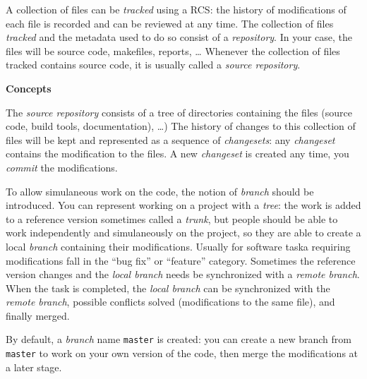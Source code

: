 \documentclass[onecolumn, oneside, a4paper, 11pt]{memoir}
\theoremstyle{remark}
\begin{document}
\medskip
A collection of files can be \textit{tracked} using a RCS: the history of modifications of each file is recorded and can be reviewed at any time.
The collection of files \textit{tracked} and the metadata used to do so consist of a \textit{repository}.
In your case, the files will be source code, makefiles, reports, \dots
Whenever the collection of files tracked contains source code, it is usually called a \textit{source repository}.

\bigskip
\textbf{Concepts}

\medskip
The \textit{source repository} consists of a tree of directories containing the files (source code, build tools, documentation), \dots)
The history of changes to this collection of files will be kept and represented as a sequence of \textit{changesets}: any \textit{changeset} contains the modification to the files.
A new \textit{changeset} is created any time, you \textit{commit} the modifications.

\medskip
To allow simulaneous work on the code, the notion of \textit{branch} should be introduced.
You can represent working on a project with a \textit{tree}: the work is added to a reference version sometimes called a \textit{trunk}, but people should be able to work independently and simulaneously on the project, so they are able to create a local \textit{branch} containing their modifications.
Usually for software taska requiring modifications fall in the ``bug fix'' or ``feature'' category.
Sometimes the reference version changes and the \textit{local branch} needs be synchronized with a \textit{remote branch}.
When the task is completed, the \textit{local branch} can be synchronized with the \textit{remote branch}, possible conflicts solved (modifications to the same file), and finally merged.

\begin{center}
\end{center}

By default, a \textit{branch} name \texttt{master} is created: you can create a new branch from \texttt{master} to work on your own version of the code, then merge the modifications at a later stage.
\end{document}
